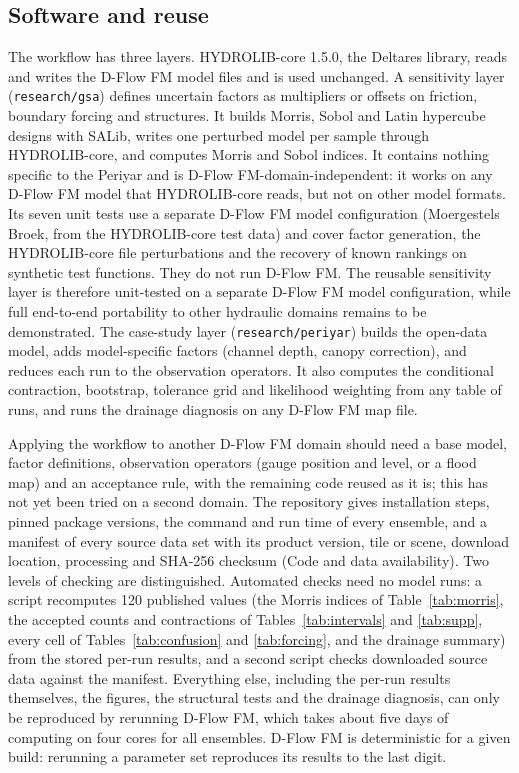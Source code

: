 \documentclass[preprint,12pt,authoryear]{elsarticle}
\begin{document}
\subsection{Software and reuse}
\label{sec:software}
The workflow has three layers. HYDROLIB-core 1.5.0, the Deltares library, reads and writes the D-Flow FM model files and is used unchanged. A sensitivity layer (\texttt{research/gsa}) defines uncertain factors as multipliers or offsets on friction, boundary forcing and structures. It builds Morris, Sobol and Latin hypercube designs with SALib, writes one perturbed model per sample through HYDROLIB-core, and computes Morris and Sobol indices. It contains nothing specific to the Periyar and is D-Flow FM-domain-independent: it works on any D-Flow FM model that HYDROLIB-core reads, but not on other model formats. Its seven unit tests use a separate D-Flow FM model configuration (Moergestels Broek, from the HYDROLIB-core test data) and cover factor generation, the HYDROLIB-core file perturbations and the recovery of known rankings on synthetic test functions. They do not run D-Flow FM. The reusable sensitivity layer is therefore unit-tested on a separate D-Flow FM model configuration, while full end-to-end portability to other hydraulic domains remains to be demonstrated. The case-study layer (\texttt{research/periyar}) builds the open-data model, adds model-specific factors (channel depth, canopy correction), and reduces each run to the observation operators. It also computes the conditional contraction, bootstrap, tolerance grid and likelihood weighting from any table of runs, and runs the drainage diagnosis on any D-Flow FM map file.

Applying the workflow to another D-Flow FM domain should need a base model, factor definitions, observation operators (gauge position and level, or a flood map) and an acceptance rule, with the remaining code reused as it is; this has not yet been tried on a second domain. The repository gives installation steps, pinned package versions, the command and run time of every ensemble, and a manifest of every source data set with its product version, tile or scene, download location, processing and SHA-256 checksum (Code and data availability). Two levels of checking are distinguished. Automated checks need no model runs: a script recomputes 120 published values (the Morris indices of Table~\ref{tab:morris}, the accepted counts and contractions of Tables~\ref{tab:intervals} and \ref{tab:supp}, every cell of Tables~\ref{tab:confusion} and \ref{tab:forcing}, and the drainage summary) from the stored per-run results, and a second script checks downloaded source data against the manifest. Everything else, including the per-run results themselves, the figures, the structural tests and the drainage diagnosis, can only be reproduced by rerunning D-Flow FM, which takes about five days of computing on four cores for all ensembles. D-Flow FM is deterministic for a given build: rerunning a parameter set reproduces its results to the last digit.
\end{document}
